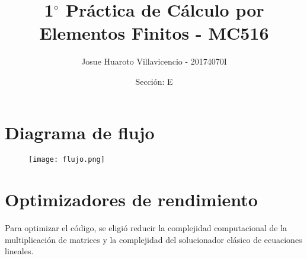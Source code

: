 \documentclass[12pt,a3paper]{article}
\author{Josue Huaroto Villavicencio - 20174070I}
\title{1$^{\circ}$ Práctica de Cálculo por Elementos Finitos - MC516}
\date{Sección: E}
\begin{document}
\maketitle
\section{Diagrama de flujo}
\begin{figure}[H]
\begin{center}
\texttt{[image: flujo.png]}
\end{center}
\end{figure}
\section{Optimizadores de rendimiento}
Para optimizar el código, se eligió reducir la complejidad computacional de la multiplicación de matrices y la complejidad del solucionador clásico de ecuaciones lineales.
\end{document}
